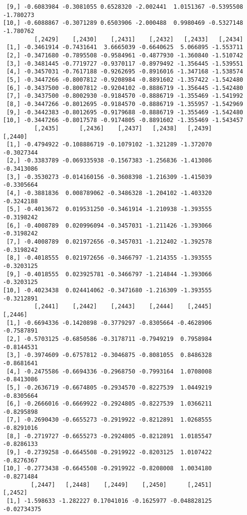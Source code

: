 \documentclass[
  letterpaper,
  DIV=11,
  numbers=noendperiod]{scrreprt}
\begin{document}
\begin{verbatim}
 [9,] -0.6083984 -0.3081055 0.6528320 -2.002441  1.0151367 -0.5395508 -1.780273
[10,] -0.6088867 -0.3071289 0.6503906 -2.000488  0.9980469 -0.5327148 -1.780762
         [,2429]    [,2430]    [,2431]    [,2432]   [,2433]   [,2434]
 [1,] -0.3461914 -0.7431641  3.6665039 -0.6640625  5.066895 -1.553711
 [2,] -0.3471680 -0.7895508 -0.9584961 -0.4877930 -1.360840 -1.510742
 [3,] -0.3481445 -0.7719727 -0.9370117 -0.8979492 -1.356445 -1.539551
 [4,] -0.3457031 -0.7617188 -0.9262695 -0.8916016 -1.347168 -1.538574
 [5,] -0.3447266 -0.8007812 -0.9208984 -0.8891602 -1.357422 -1.542480
 [6,] -0.3437500 -0.8007812 -0.9204102 -0.8886719 -1.356445 -1.542480
 [7,] -0.3437500 -0.8002930 -0.9184570 -0.8886719 -1.355469 -1.541992
 [8,] -0.3447266 -0.8012695 -0.9184570 -0.8886719 -1.355957 -1.542969
 [9,] -0.3442383 -0.8012695 -0.9179688 -0.8886719 -1.355469 -1.542480
[10,] -0.3447266 -0.8017578 -0.9174805 -0.8891602 -1.355469 -1.543457
         [,2435]      [,2436]    [,2437]   [,2438]   [,2439]    [,2440]
 [1,] -0.4794922 -0.108886719 -0.1079102 -1.321289 -1.372070 -0.3027344
 [2,] -0.3383789 -0.069335938 -0.1567383 -1.256836 -1.413086 -0.3413086
 [3,] -0.3530273 -0.014160156 -0.3608398 -1.216309 -1.415039 -0.3305664
 [4,] -0.3881836  0.008789062 -0.3486328 -1.204102 -1.403320 -0.3242188
 [5,] -0.4013672  0.019531250 -0.3461914 -1.210938 -1.393555 -0.3198242
 [6,] -0.4008789  0.020996094 -0.3457031 -1.211426 -1.393066 -0.3198242
 [7,] -0.4008789  0.021972656 -0.3457031 -1.212402 -1.392578 -0.3198242
 [8,] -0.4018555  0.021972656 -0.3466797 -1.214355 -1.393555 -0.3203125
 [9,] -0.4018555  0.023925781 -0.3466797 -1.214844 -1.393066 -0.3203125
[10,] -0.4023438  0.024414062 -0.3471680 -1.216309 -1.393555 -0.3212891
         [,2441]    [,2442]    [,2443]    [,2444]    [,2445]    [,2446]
 [1,] -0.6694336 -0.1420898 -0.3779297 -0.8305664 -0.4628906 -0.7587891
 [2,] -0.5703125 -0.6850586 -0.3178711 -0.7949219  0.7958984 -0.8144531
 [3,] -0.3974609 -0.6757812 -0.3046875 -0.8081055  0.8486328 -0.8681641
 [4,] -0.2475586 -0.6694336 -0.2968750 -0.7993164  1.0708008 -0.8413086
 [5,] -0.2636719 -0.6674805 -0.2934570 -0.8227539  1.0449219 -0.8305664
 [6,] -0.2666016 -0.6669922 -0.2924805 -0.8227539  1.0366211 -0.8295898
 [7,] -0.2690430 -0.6655273 -0.2919922 -0.8212891  1.0268555 -0.8291016
 [8,] -0.2719727 -0.6655273 -0.2924805 -0.8212891  1.0185547 -0.8286133
 [9,] -0.2739258 -0.6645508 -0.2919922 -0.8203125  1.0107422 -0.8276367
[10,] -0.2773438 -0.6645508 -0.2919922 -0.8208008  1.0034180 -0.8271484
        [,2447]   [,2448]    [,2449]    [,2450]      [,2451]     [,2452]
 [1,] -1.598633 -1.282227 0.17041016 -0.1625977 -0.048828125 -0.02734375

\end{verbatim}
\end{document}

